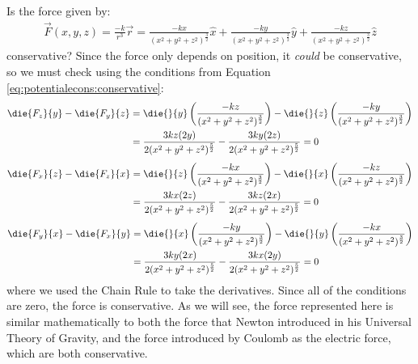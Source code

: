 \begin{example}{\label{ex:potentialecons:gravitycons}Is the force given by:
\begin{align*}
\vec F(x,y,z) = \frac{-k}{r^3}\vec r = \frac{-kx}{(x^2+y^2+z^2)^\frac{3}{2}}\hat x + \frac{-ky}{(x^2+y^2+z^2)^\frac{3}{2}}\hat y + \frac{-kz}{(x^2+y^2+z^2)^\frac{3}{2}}\hat z
\end{align*}
conservative?}
Since the force only depends on position, it \textit{could} be conservative, so we must check using the conditions from Equation \ref{eq:potentialecons:conservative}:
\begin{align*}
\die{F_z}{y}-\die{F_y}{z} &= \die{}{y}\left(\frac{-kz}{(x^2+y^2+z^2)^\frac{3}{2}}\right)-\die{}{z}\left( \frac{-ky}{(x^2+y^2+z^2)^\frac{3}{2}}\right)\\
&=\frac{3kz(2y)}{2(x^2+y^2+z^2)^\frac{5}{2}}-\frac{3ky(2z)}{2(x^2+y^2+z^2)^\frac{5}{2}} = 0
\end{align*}
\begin{align*}
\die{F_x}{z}-\die{F_z}{x} &= \die{}{z}\left(\frac{-kx}{(x^2+y^2+z^2)^\frac{3}{2}}\right)-\die{}{x}\left( \frac{-kz}{(x^2+y^2+z^2)^\frac{3}{2}}\right)\\
&=\frac{3kx(2z)}{2(x^2+y^2+z^2)^\frac{5}{2}}-\frac{3kz(2x)}{2(x^2+y^2+z^2)^\frac{5}{2}} = 0
\end{align*}
\begin{align*}
\die{F_y}{x}-\die{F_x}{y} &= \die{}{x}\left(\frac{-ky}{(x^2+y^2+z^2)^\frac{3}{2}}\right)-\die{}{y}\left( \frac{-kx}{(x^2+y^2+z^2)^\frac{3}{2}}\right)\\
&=\frac{3ky(2x)}{2(x^2+y^2+z^2)^\frac{5}{2}}-\frac{3kx(2y)}{2(x^2+y^2+z^2)^\frac{5}{2}} = 0
\end{align*}
where we used the Chain Rule to take the derivatives. Since all of the conditions are zero, the force is conservative. As we will see, the force represented here is similar mathematically to both the force that Newton introduced in his Universal Theory of Gravity, and the force introduced by Coulomb as the electric force, which are both conservative.
\end{example}

